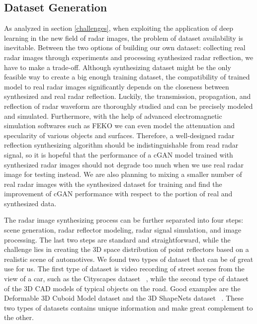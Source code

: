\subsection{Dataset Generation}
As analyzed in section \ref{challenges}, when exploiting the application of deep learning in the new field of radar images, the problem of dataset availability is inevitable. Between the two options of building our own dataset: collecting real radar images through experiments and processing synthesized radar reflection, we have to make a trade-off. Although synthesizing dataset might be the only feasible way to create a big enough training dataset, the compatibility of trained model to real radar images significantly depends on the closeness between synthesized  and real radar reflection. Luckily, the transmission, propagation, and reflection of radar waveform are thoroughly studied and can be precisely modeled and simulated. Furthermore, with the help of advanced electromagnetic simulation softwares such as FEKO we can even model the attenuation and specularity of various objects and surfaces. Therefore, a well-designed radar reflection synthesizing algorithm should be indistinguishable from read radar signal, so it is hopeful that the performance of a cGAN model trained with synthesized radar images should not degrade too much when we use real radar image for testing instead. We are also planning to mixing a smaller number of real radar images with the synthesized dataset for training and find the improvement of cGAN performance with respect to the portion of real and synthesized data.  

The radar image synthesizing process can be further separated into four steps: scene generation, radar reflector modeling, radar signal simulation, and image processing. The last two steps are standard and straightforward, while the challenge lies in creating the 3D space distribution of point reflectors based on a realistic scene of automotives. We found two types of dataset that can be of great use for us. The first type of dataset is video recording of street scenes from the view of a car, such as the Cityscapes dataset ~\cite{cityscapes}, while the second type of dataset of the 3D CAD models of typical objects on the road. Good examples are the Deformable 3D Cuboid Model dataset and the 3D ShapeNets dataset ~\cite{3Ddata, shapenets}. These two types of datasets contains unique information and make great complement to the other.

